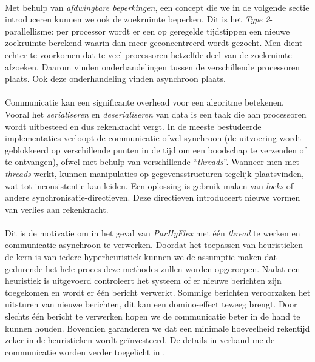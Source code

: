 \paragraph{}
Met behulp van \emph{afdwingbare beperkingen}, een concept die we in de volgende sectie introduceren kunnen we ook de zoekruimte beperken. Dit is het \emph{Type 2}-parallellisme: per processor wordt er een op geregelde tijdstippen een nieuwe zoekruimte berekend waarin dan meer geconcentreerd wordt gezocht. Men dient echter te voorkomen dat te veel processoren hetzelfde deel van de zoekruimte afzoeken. Daarom vinden onderhandelingen tussen de verschillende processoren plaats. Ook deze onderhandeling vinden asynchroon plaats.

\paragraph{}
Communicatie kan een significante overhead voor een algoritme betekenen. Vooral het \emph{serialiseren} en \emph{deserialiseren} van data is een taak die aan processoren wordt uitbesteed en dus rekenkracht vergt. In de meeste bestudeerde implementaties verloopt de communicatie ofwel synchroon (de uitvoering wordt geblokkeerd op verschillende punten in de tijd om een boodschap te verzenden of te ontvangen), ofwel met behulp van verschillende ``\emph{threads}''. Wanneer men met \emph{threads} werkt, kunnen manipulaties op gegevensstructuren tegelijk plaatsvinden, wat tot inconsistentie kan leiden. Een oplossing is gebruik maken van \emph{locks} of andere synchronisatie-directieven. Deze directieven introduceert nieuwe vormen van verlies aan rekenkracht.

\paragraph{}
Dit is de motivatie om in het geval van \emph{ParHyFlex} met \'e\'en \emph{thread} te werken en communicatie asynchroon te verwerken. Doordat het toepassen van heuristieken de kern is van iedere hyperheuristiek kunnen we de assumptie maken dat gedurende het hele proces deze methodes zullen worden opgeroepen. Nadat een heuristiek is uitgevoerd controleert het systeem of er nieuwe berichten zijn toegekomen en wordt er \'e\'en bericht verwerkt. Sommige berichten veroorzaken het uitsturen van nieuwe berichten, dit kan een domino-effect teweeg brengt. Door slechts \'e\'en bericht te verwerken hopen we de communicatie beter in de hand te kunnen houden. Bovendien garanderen we dat een minimale hoeveelheid rekentijd zeker in de heuristieken wordt ge\"investeerd. De details in verband me de communicatie worden verder toegelicht in .

